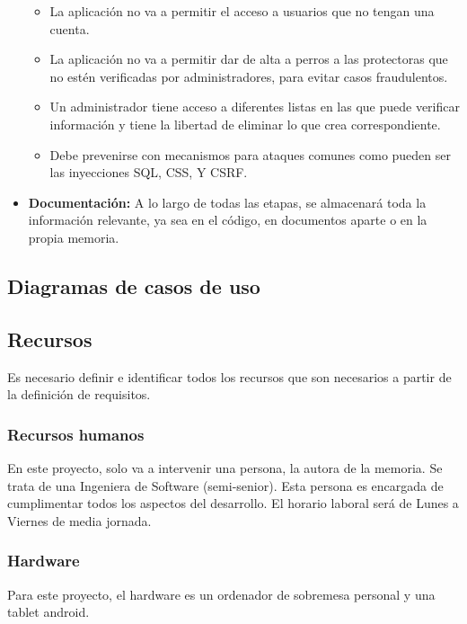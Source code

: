 \documentclass[a4paper, 12pt]{article}
\begin{document}
\begin{itemize}[noitemsep]
\begin{itemize}[noitemsep]
			\item La aplicación no va a permitir el acceso a usuarios que no tengan una cuenta.
			\item La aplicación no va a permitir dar de alta a perros a las protectoras que no estén verificadas por administradores, para evitar casos fraudulentos.
			\item Un administrador tiene acceso a diferentes listas en las que puede verificar información y tiene la libertad de eliminar lo que crea correspondiente.
			\item Debe prevenirse con mecanismos para ataques comunes como pueden ser las inyecciones SQL, CSS, Y CSRF. 
		\end{itemize}
	\item \textbf{Documentación:} A lo largo de todas las etapas, se almacenará toda la información relevante, ya sea en el código, en documentos aparte o en la propia memoria.
\end{itemize}

\subsection{Diagramas de casos de uso}

\subsection{Recursos}

Es necesario definir e identificar todos los recursos que son necesarios a partir de la definición de requisitos.

\subsubsection{Recursos humanos}

En este proyecto, solo va a intervenir una persona, la autora de la memoria. Se trata de una Ingeniera de Software (semi-senior). Esta persona es encargada de cumplimentar todos los aspectos del desarrollo. El horario laboral será de Lunes a Viernes de media jornada.


\subsubsection{Hardware}

Para este proyecto, el hardware es un ordenador de sobremesa personal y una tablet android.
\end{document}
